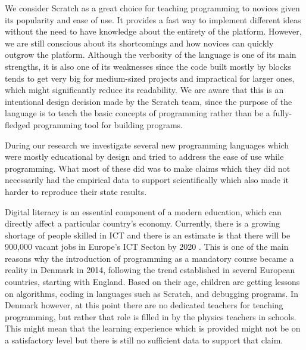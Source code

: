 We consider Scratch as a great choice for teaching programming to novices given its popularity and ease of use. It provides a fast way to implement different ideas without the need to have knowledge about the entirety of the platform. However, we are still conscious about its shortcomings and how novices can quickly outgrow the platform. Although the verbosity of the language is one of its main strengths, it is also one of its weaknesses since the code built mostly by blocks tends to get very big for medium-sized projects and impractical for larger ones, which might significantly reduce its readability. We are aware that this is an intentional design decision made by the Scratch team, since the purpose of the language is to teach the basic concepts of programming rather than be a fully-fledged programming tool for building programs. 

During our research we investigate several new programming languages which were mostly educational by design and tried to address the ease of use while programming. What most of these did was to make claims which they did not necessarily had the empirical data to support scientifically which also made it harder to reproduce their state results. 

Digital literacy is an essential component of a modern education, which can directly affect a particular country's economy. Currently, there is a growing shortage of people skilled in ICT and there is an estimate is that there will be 900,000 vacant jobs in Europe's ICT Secton by 2020 \cite{pretz14}. This is one of the main reasons why the introduction of programming as a mandatory course became a reality in Denmark in 2014, following the trend established in several European countries, starting with England. Based on their age, children are getting lessons on algorithms, coding in languages such as Scratch, and debugging programs. In Denmark however, at this point there are no dedicated teachers for teaching programming, but rather that role is filled in by the physics teachers in schools. This might mean that the learning experience which is provided might not be on a satisfactory level but there is still no sufficient data to support that claim.



